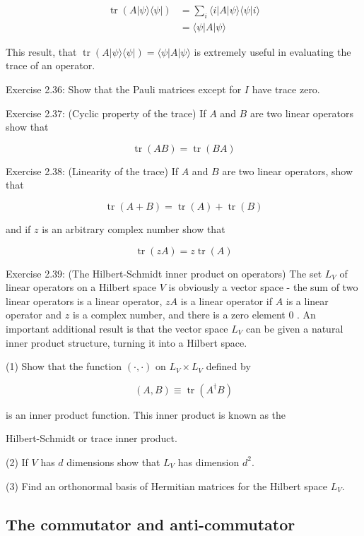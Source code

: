 \documentclass[
	11pt, %
	fleqn, %
	a4paper, %
]{LegrandOrangeBook}
\begin{document}
$$
\begin{aligned}
\operatorname{tr}(A|\psi\rangle\langle\psi|) & =\sum_{i}\langle i|A| \psi\rangle\langle\psi | i\rangle \\
& =\langle\psi|A| \psi\rangle
\end{aligned}
$$

This result, that $\operatorname{tr}(A|\psi\rangle\langle\psi|)=\langle\psi|A| \psi\rangle$ is extremely useful in evaluating the trace of an operator.

Exercise 2.36: Show that the Pauli matrices except for $I$ have trace zero.

Exercise 2.37: (Cyclic property of the trace) If $A$ and $B$ are two linear operators show that

$$
\operatorname{tr}(A B)=\operatorname{tr}(B A)
$$

Exercise 2.38: (Linearity of the trace) If $A$ and $B$ are two linear operators, show that

$$
\operatorname{tr}(A+B)=\operatorname{tr}(A)+\operatorname{tr}(B)
$$

and if $z$ is an arbitrary complex number show that

$$
\operatorname{tr}(z A)=z \operatorname{tr}(A)
$$

Exercise 2.39: (The Hilbert-Schmidt inner product on operators) The set $L_{V}$ of linear operators on a Hilbert space $V$ is obviously a vector space - the sum of two linear operators is a linear operator, $z A$ is a linear operator if $A$ is a linear operator and $z$ is a complex number, and there is a zero element 0 . An important additional result is that the vector space $L_{V}$ can be given a natural inner product structure, turning it into a Hilbert space.

(1) Show that the function $(\cdot, \cdot)$ on $L_{V} \times L_{V}$ defined by

$$
(A, B) \equiv \operatorname{tr}\left(A^{\dagger} B\right)
$$

is an inner product function. This inner product is known as the

Hilbert-Schmidt or trace inner product.

(2) If $V$ has $d$ dimensions show that $L_{V}$ has dimension $d^{2}$.

(3) Find an orthonormal basis of Hermitian matrices for the Hilbert space $L_{V}$.

\subsection{The commutator and anti-commutator}
\end{document}
